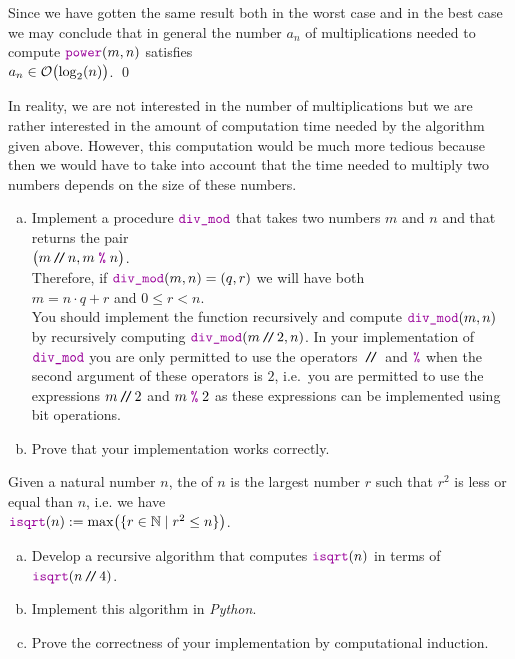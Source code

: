 Since we have gotten the same result both in the worst case and in the best case we may conclude
that in general the number $a_n$ of multiplications needed to compute $\mytt{power}(m, n)$ satisfies 
\\[0.2cm]
\hspace*{1.3cm} 
$a_n \in \mathcal{O}\bigl(\log_2(n)\bigr)$. \qed

\remark
In reality, we are not interested in the number of multiplications but we are rather interested
in the amount of computation time needed by the algorithm given above.
However, this computation would be much more tedious because then we would have to take into account
that the time needed to multiply two numbers depends on the size of these numbers.

\exercise
\begin{enumerate}[(a)]
\item Implement a procedure $\mytt{div\_mod}$ that takes two numbers $m$ and $n$ and that returns the pair
      \\[0.2cm]
      \hspace*{1.3cm}
      $\bigl(m \dv n, m \;\mytt{\%}\; n\bigr)$.
      \\[0.2cm]
      Therefore, if $\mytt{div\_mod}(m, n) = (q,r)$ we will have both
      \\[0.2cm]
      \hspace*{1.3cm}
      $m = n \cdot q + r$ \quad and \quad $0 \leq r < n$.
      \\[0.2cm]
      You should implement the function recursively and compute 
      $\mytt{div\_mod}(m, n)$ by recursively computing $\mytt{div\_mod}(m \dv 2, n)$.
      In your implementation of $\mytt{div\_mod}$ you are only permitted to use the operators $\mbox{\,\texttt{/}$\!$\texttt{/}\,}$ and
      $\mytt{\%}$ when the second argument of these operators is $2$, i.e.~you are permitted to
      use the expressions $m \mbox{\,\texttt{/}$\!$\texttt{/}\,} 2$ and $m \;\mytt{\%}\; 2$ as these expressions can be implemented
      using bit operations.
\item Prove that your implementation works correctly.
      \eoxs
\end{enumerate} 

\exercise
Given a natural number $n$, the   of $n$ is the largest
number $r$ such that $r^2$ is less or equal than $n$, i.e. we have
\\[0.2cm]
\hspace*{1.3cm}
$\mytt{isqrt}(n) := \max\bigl(\{ r \in \mathbb{N} \mid r^2 \leq n \}\bigr)$.
\begin{enumerate}[(a)]
\item Develop a recursive algorithm that computes $\mytt{isqrt}(n)$ in terms of $\mytt{isqrt}(n\dv4)$.
\item Implement this algorithm in \textsl{Python}.
\item Prove the correctness of your implementation by computational induction. \eoxs
\end{enumerate}

